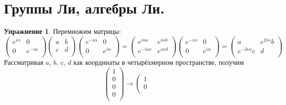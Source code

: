 \documentclass[12pt]{article}
\theoremstyle{definition}
\newtheorem{upr}[zad]{Упражнение}
\begin{document}
\section{Группы Ли, алгебры Ли.}
\begin{upr}
Перемножим матрицы:
\begin{equation*}
    \left(
    \begin{array}{cc}
    e^{i\alpha} & 0\\
    0 & e^{-i\alpha}\\
    \end{array}
    \right)\left(
    \begin{array}{cc}
    a & b\\
    c & d\\
    \end{array}
    \right)\left(
    \begin{array}{cc}
    e^{-i\alpha} & 0\\
    0 & e^{i\alpha}\\
    \end{array}
    \right)=\left(
    \begin{array}{cc}
    e^{i\alpha a} & e^{i\alpha b}\\
    e^{-i\alpha c} & e^{i\alpha d}\\
    \end{array}
    \right)\left(
    \begin{array}{cc}
    e^{-i\alpha} & 0\\
    0 & e^{i\alpha}\\
    \end{array}
    \right)=\left(
    \begin{array}{cc}
    a & e^{2i\alpha}b\\
    e^{-2i\alpha}c & d\\
    \end{array}
    \right)
    \end{equation*}
    Рассматривая $a$, $b$, $c$, $d$ как координаты в четырёхмерном пространстве, получим
    \begin{equation*}
        \left(
    \begin{array}{c}
    1\\
    0\\
    0\\
    0\\
    \end{array}
    \right)\rightarrow\left(
    \begin{array}{c}
    1\\
    0\\

\end{array}
\end{equation*}
\end{upr}
\end{document}
